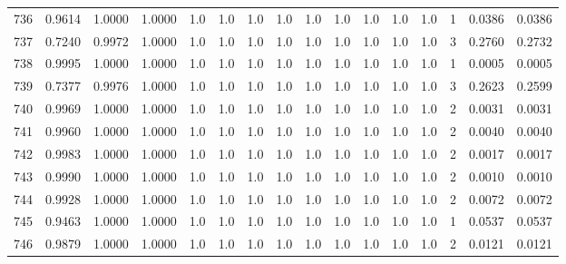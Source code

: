 \begin{tabular}{lrrrrrrrrrrrrrrr}
736 &      0.9614 &  1.0000 &  1.0000 &     1.0 &     1.0 &     1.0 &     1.0 &     1.0 &     1.0 &     1.0 &      1.0 &        1.0 &      1 &                    0.0386 &                     0.0386 \\
737 &      0.7240 &  0.9972 &  1.0000 &     1.0 &     1.0 &     1.0 &     1.0 &     1.0 &     1.0 &     1.0 &      1.0 &        1.0 &      3 &                    0.2760 &                     0.2732 \\
738 &      0.9995 &  1.0000 &  1.0000 &     1.0 &     1.0 &     1.0 &     1.0 &     1.0 &     1.0 &     1.0 &      1.0 &        1.0 &      1 &                    0.0005 &                     0.0005 \\
739 &      0.7377 &  0.9976 &  1.0000 &     1.0 &     1.0 &     1.0 &     1.0 &     1.0 &     1.0 &     1.0 &      1.0 &        1.0 &      3 &                    0.2623 &                     0.2599 \\
740 &      0.9969 &  1.0000 &  1.0000 &     1.0 &     1.0 &     1.0 &     1.0 &     1.0 &     1.0 &     1.0 &      1.0 &        1.0 &      2 &                    0.0031 &                     0.0031 \\
741 &      0.9960 &  1.0000 &  1.0000 &     1.0 &     1.0 &     1.0 &     1.0 &     1.0 &     1.0 &     1.0 &      1.0 &        1.0 &      2 &                    0.0040 &                     0.0040 \\
742 &      0.9983 &  1.0000 &  1.0000 &     1.0 &     1.0 &     1.0 &     1.0 &     1.0 &     1.0 &     1.0 &      1.0 &        1.0 &      2 &                    0.0017 &                     0.0017 \\
743 &      0.9990 &  1.0000 &  1.0000 &     1.0 &     1.0 &     1.0 &     1.0 &     1.0 &     1.0 &     1.0 &      1.0 &        1.0 &      2 &                    0.0010 &                     0.0010 \\
744 &      0.9928 &  1.0000 &  1.0000 &     1.0 &     1.0 &     1.0 &     1.0 &     1.0 &     1.0 &     1.0 &      1.0 &        1.0 &      2 &                    0.0072 &                     0.0072 \\
745 &      0.9463 &  1.0000 &  1.0000 &     1.0 &     1.0 &     1.0 &     1.0 &     1.0 &     1.0 &     1.0 &      1.0 &        1.0 &      1 &                    0.0537 &                     0.0537 \\
746 &      0.9879 &  1.0000 &  1.0000 &     1.0 &     1.0 &     1.0 &     1.0 &     1.0 &     1.0 &     1.0 &      1.0 &        1.0 &      2 &                    0.0121 &                     0.0121 \\

\end{tabular}
